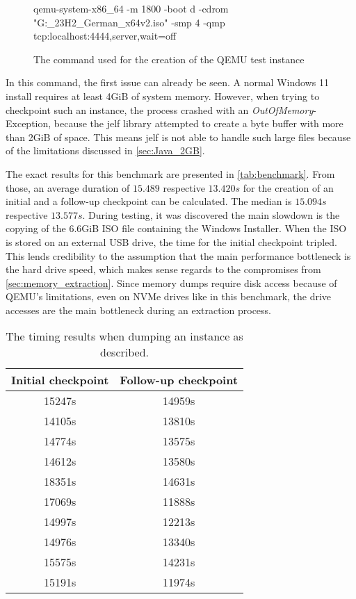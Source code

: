 \begin{figure}[h]
    \begin{ffcode}
        qemu-system-x86_64 -m 1800 -boot d -cdrom "G:_23H2_German_x64v2.iso" -smp 4 -qmp tcp:localhost:4444,server,wait=off
    \end{ffcode}
    \label{fig:QEMU_Windows_Test}
    \caption{The command used for the creation of the QEMU test instance}
\end{figure}

In this command, the first issue can already be seen.
A normal Windows 11 install requires at least 4GiB of system memory.
However, when trying to checkpoint such an instance, the process crashed with an \emph{OutOfMemory}-Exception,
because the jelf library\cite{jelf} attempted to create a byte buffer with more than 2GiB of space.
This means jelf is not able to handle such large files because of the limitations discussed in \autoref{sec:Java_2GB}.

The exact results for this benchmark are presented in \autoref{tab:benchmark}.
From those, an average duration of $15.489$ respective $13.420s$ for the creation of an initial and a follow-up checkpoint can be calculated.
The median is $15.094s$ respective $13.577s$.
During testing, it was discovered the main slowdown is the copying of the 6.6GiB ISO file containing the Windows Installer.
When the ISO is stored on an external USB drive, the time for the initial checkpoint tripled.
This lends credibility to the assumption that the main performance bottleneck is the hard drive speed,
which makes sense regards to the compromises from \autoref{sec:memory_extraction}.
Since memory dumps require disk access because of QEMU's limitations,
even on NVMe drives like in this benchmark, the drive accesses are the main bottleneck during an extraction process.

\begin{table}
    \centering
    \begin{tabular}{| c | c |}
      \hline
      Initial checkpoint & Follow-up checkpoint \\
      \hline
      15247s & 14959s \\
      \hline
      14105s & 13810s \\
      \hline
      14774s & 13575s \\
      \hline
      14612s & 13580s \\
      \hline
      18351s & 14631s \\
      \hline
      17069s & 11888s \\
      \hline
      14997s & 12213s \\
      \hline
      14976s & 13340s \\
      \hline
      15575s & 14231s \\
      \hline
      15191s & 11974s \\
      \hline
    \end{tabular}
    \caption{The timing results when dumping an instance as described.}
    \label{tab:benchmark}
  \end{table}

